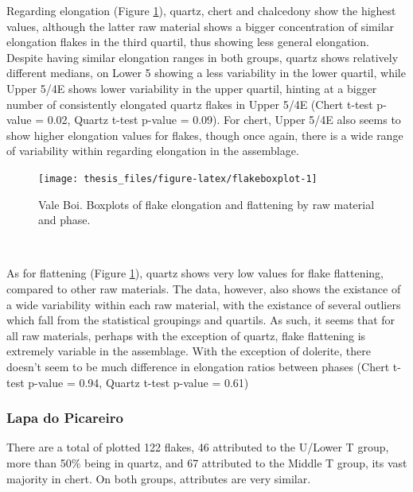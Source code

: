 \documentclass[12pt,twoside]{reedthesis}
\begin{document}
Regarding elongation (Figure \ref{fig:flakeboxplot}), quartz, chert and chalcedony show the highest values, although the latter raw material shows a bigger concentration of similar elongation flakes in the third quartil, thus showing less general elongation. Despite having similar elongation ranges in both groups, quartz shows relatively different medians, on Lower 5 showing a less variability in the lower quartil, while Upper 5/4E shows lower variability in the upper quartil, hinting at a bigger number of consistently elongated quartz flakes in Upper 5/4E (Chert t-test p-value = 0.02, Quartz t-test p-value = 0.09). For chert, Upper 5/4E also seems to show higher elongation values for flakes, though once again, there is a wide range of variability within regarding elongation in the assemblage.
\begin{figure}[H]

{\centering \texttt{[image: thesis\_files/figure-latex/flakeboxplot-1]} 

}

\caption{Vale Boi. Boxplots of flake elongation and flattening by raw material and phase.}\label{fig:flakeboxplot}
\end{figure}
~

As for flattening (Figure \ref{fig:flakeboxplot}), quartz shows very low values for flake flattening, compared to other raw materials. The data, however, also shows the existance of a wide variability within each raw material, with the existance of several outliers which fall from the statistical groupings and quartils. As such, it seems that for all raw materials, perhaps with the exception of quartz, flake flattening is extremely variable in the assemblage. With the exception of dolerite, there doesn't seem to be much difference in elongation ratios between phases (Chert t-test p-value = 0.94, Quartz t-test p-value = 0.61)

\hypertarget{lapa-do-picareiro-5}{%
\subsubsection{Lapa do Picareiro}\label{lapa-do-picareiro-5}}

There are a total of plotted 122 flakes, 46 attributed to the U/Lower T group, more than 50\% being in quartz, and 67 attributed to the Middle T group, its vast majority in chert. On both groups, attributes are very similar.
\end{document}
